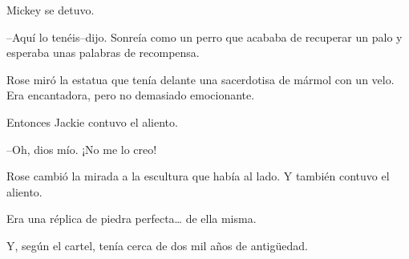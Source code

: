 Mickey se detuvo.

--Aquí lo tenéis--dijo. Sonreía como un perro que acababa de recuperar
un palo y esperaba unas palabras de recompensa.

Rose miró la estatua que tenía delante una sacerdotisa de mármol con un
velo. Era encantadora, pero no demasiado emocionante.

Entonces Jackie contuvo el aliento.

--Oh, dios mío. ¡No me lo creo!

Rose cambió la mirada a la escultura que había al lado. Y también
contuvo el aliento.

Era una réplica de piedra perfecta\ldots{} de ella misma.

Y, según el cartel, tenía cerca de dos mil años de antigüedad.
